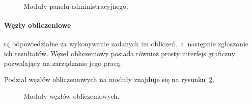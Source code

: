 \documentclass[a4paper,11pt,twoside]{report}
\theoremstyle{definition}
\begin{document}
\begin{figure} 
    \caption{Moduły panelu administracyjnego.}
    \label{admin-panel-model}
\end{figure}

\paragraph{Węzły obliczeniowe}

są odpowiedzialne za wykonywanie zadanych im obliczeń,~a~następnie zgłaszanie ich rezultatów. Węzeł obliczeniowy posiada również prosty interfejs graficzny pozwalający na zarządzanie jego pracą.

Podział węzłów obliczeniowych na moduły znajduje się na rysunku~\ref{node-model}.

\begin{figure} 
    \caption{Moduły węzłów obliczeniowych.}
    \label{node-model}
\end{figure}
\end{document}

